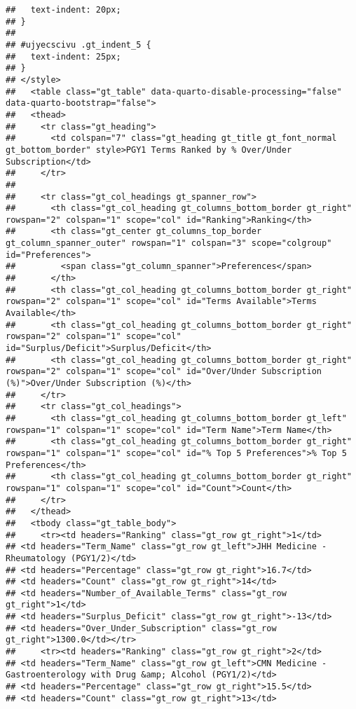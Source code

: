\documentclass[
]{article}
\begin{document}
\begin{verbatim}
##   text-indent: 20px;
## }
## 
## #ujyecscivu .gt_indent_5 {
##   text-indent: 25px;
## }
## </style>
##   <table class="gt_table" data-quarto-disable-processing="false" data-quarto-bootstrap="false">
##   <thead>
##     <tr class="gt_heading">
##       <td colspan="7" class="gt_heading gt_title gt_font_normal gt_bottom_border" style>PGY1 Terms Ranked by % Over/Under Subscription</td>
##     </tr>
##     
##     <tr class="gt_col_headings gt_spanner_row">
##       <th class="gt_col_heading gt_columns_bottom_border gt_right" rowspan="2" colspan="1" scope="col" id="Ranking">Ranking</th>
##       <th class="gt_center gt_columns_top_border gt_column_spanner_outer" rowspan="1" colspan="3" scope="colgroup" id="Preferences">
##         <span class="gt_column_spanner">Preferences</span>
##       </th>
##       <th class="gt_col_heading gt_columns_bottom_border gt_right" rowspan="2" colspan="1" scope="col" id="Terms Available">Terms Available</th>
##       <th class="gt_col_heading gt_columns_bottom_border gt_right" rowspan="2" colspan="1" scope="col" id="Surplus/Deficit">Surplus/Deficit</th>
##       <th class="gt_col_heading gt_columns_bottom_border gt_right" rowspan="2" colspan="1" scope="col" id="Over/Under Subscription (%)">Over/Under Subscription (%)</th>
##     </tr>
##     <tr class="gt_col_headings">
##       <th class="gt_col_heading gt_columns_bottom_border gt_left" rowspan="1" colspan="1" scope="col" id="Term Name">Term Name</th>
##       <th class="gt_col_heading gt_columns_bottom_border gt_right" rowspan="1" colspan="1" scope="col" id="% Top 5 Preferences">% Top 5 Preferences</th>
##       <th class="gt_col_heading gt_columns_bottom_border gt_right" rowspan="1" colspan="1" scope="col" id="Count">Count</th>
##     </tr>
##   </thead>
##   <tbody class="gt_table_body">
##     <tr><td headers="Ranking" class="gt_row gt_right">1</td>
## <td headers="Term_Name" class="gt_row gt_left">JHH Medicine - Rheumatology (PGY1/2)</td>
## <td headers="Percentage" class="gt_row gt_right">16.7</td>
## <td headers="Count" class="gt_row gt_right">14</td>
## <td headers="Number_of_Available_Terms" class="gt_row gt_right">1</td>
## <td headers="Surplus_Deficit" class="gt_row gt_right">-13</td>
## <td headers="Over_Under_Subscription" class="gt_row gt_right">1300.0</td></tr>
##     <tr><td headers="Ranking" class="gt_row gt_right">2</td>
## <td headers="Term_Name" class="gt_row gt_left">CMN Medicine - Gastroenterology with Drug &amp; Alcohol (PGY1/2)</td>
## <td headers="Percentage" class="gt_row gt_right">15.5</td>
## <td headers="Count" class="gt_row gt_right">13</td>

\end{verbatim}
\end{document}
